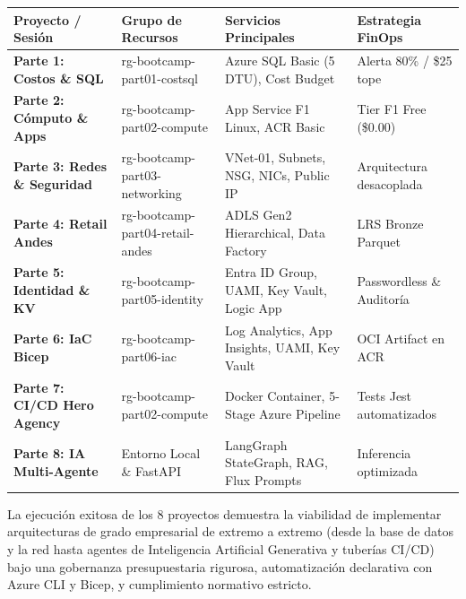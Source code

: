 \documentclass[11pt,a4paper]{article}
\begin{document}
\begin{center}
\small
\begin{tabularx}{\textwidth}{|>{\raggedright\arraybackslash\bfseries\footnotesize}p{2.6cm}|>{\raggedright\arraybackslash\ttfamily\scriptsize}p{3.8cm}|>{\raggedright\arraybackslash\footnotesize}X|>{\raggedright\arraybackslash\footnotesize}p{2.8cm}|}
\hline
\rowcolor{azurenavy!15}
\textbf{Proyecto / Sesión} & \textbf{Grupo de Recursos} & \textbf{Servicios Principales} & \textbf{Estrategia FinOps} \\ \hline
Parte 1: Costos \& SQL & rg-bootcamp-\newline part01-costsql & Azure SQL Basic (5 DTU), Cost Budget & Alerta 80\% / \$25 tope \\ \hline
Parte 2: Cómputo \& Apps & rg-bootcamp-\newline part02-compute & App Service F1 Linux, ACR Basic & Tier F1 Free (\$0.00) \\ \hline
Parte 3: Redes \& Seguridad & rg-bootcamp-\newline part03-networking & VNet-01, Subnets, NSG, NICs, Public IP & Arquitectura desacoplada \\ \hline
Parte 4: Retail Andes & rg-bootcamp-\newline part04-retail-andes & ADLS Gen2 Hierarchical, Data Factory & LRS Bronze Parquet \\ \hline
Parte 5: Identidad \& KV & rg-bootcamp-\newline part05-identity & Entra ID Group, UAMI, Key Vault, Logic App & Passwordless \& Auditoría \\ \hline
Parte 6: IaC Bicep & rg-bootcamp-\newline part06-iac & Log Analytics, App Insights, UAMI, Key Vault & OCI Artifact en ACR \\ \hline
Parte 7: CI/CD Hero Agency & rg-bootcamp-\newline part02-compute & Docker Container, 5-Stage Azure Pipeline & Tests Jest automatizados \\ \hline
Parte 8: IA Multi-Agente & Entorno Local \& FastAPI & LangGraph StateGraph, RAG, Flux Prompts & Inferencia optimizada \\ \hline
\end{tabularx}
\end{center}

\vspace{0.5cm}
\begin{archnote}[Resumen]
La ejecución exitosa de los 8 proyectos demuestra la viabilidad de implementar arquitecturas de grado empresarial de extremo a extremo (desde la base de datos y la red hasta agentes de Inteligencia Artificial Generativa y tuberías CI/CD) bajo una gobernanza presupuestaria rigurosa, automatización declarativa con Azure CLI y Bicep, y cumplimiento normativo estricto.
\end{archnote}
\end{document}
